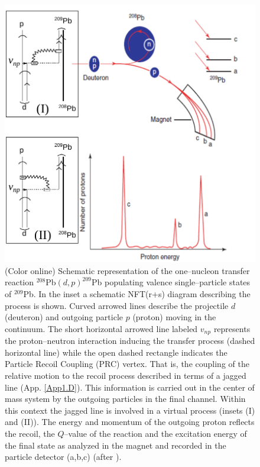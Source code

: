 \begin{figure}
\centerline {
\includegraphics*[width=12cm]{introduccion/figs/figintro2}
}
\caption{(Color online) Schematic  representation of the one--nucleon transfer reaction $^{208}$Pb$(d,p)^{209}$Pb populating  valence single--particle states of $^{209}$Pb. In the inset a schematic NFT(r+s) diagram describing the process is shown. Curved arrowed lines describe the projectile $d$ (deuteron) and outgoing particle $p$ (proton) moving in the continuum. The short horizontal arrowed line labeled $v_{np}$ represents the proton--neutron interaction inducing the transfer process (dashed horizontal line) while the  open dashed rectangle indicates the Particle Recoil Coupling (PRC) vertex. That is,  the coupling of the relative motion to the recoil process described in terms of a jagged line (App. \ref{App1.D}). This information is carried out in the center of mass system by the outgoing particles in the final channel. Within this context the jagged line is involved in a virtual process (insets (I) and (II)). The energy and momentum of the outgoing proton reflects the recoil, the  $Q$--value of the reaction and the excitation energy of the final state as analyzed in the magnet and recorded in the particle detector (a,b,c) (after \cite{Mottelson:76b}).}
\label{figintro2}
\end{figure}
